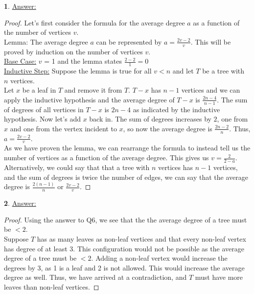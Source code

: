 \documentclass[12pt,a4paper]{article}
\theoremstyle{definition}
\newtheorem{problem}{}
\begin{document}
\begin{problem} \underline{Answer:}
\begin{proof} Let's first consider the formula for the average degree $a$ as a function of the number of vertices $v$. \\

Lemma: The average degree $a$ can be represented by $a = \frac{2v - 2}{v}$. This will be proved by induction on the number of vertices $v$. \\

\underline{Base Case:} $v$ = 1 and the lemma states $\frac{2 - 2}{1} = 0$ \\

\underline{Inductive Step:} Suppose the lemma is true for all $v < n$ and let $T$ be a tree with $n$ vertices. \\

Let $x$ be a leaf in $T$ and remove it from $T$. $T - x$ has $n - 1$ vertices and we can apply the inductive hypothesis and the average degree of $T - x$ is $\frac{2n - 4}{n - 1}$. The sum of degrees of all vertices in $T - x$ is $2n - 4$ as indicated by the inductive hypothesis. Now let's add $x$ back in. The sum of degrees increases by $2$, one from $x$ and one from the vertex incident to $x$, so now the average degree is $\frac{2n - 2}{n}$. Thus, $a = \frac{2v - 2}{v}$. \\

As we have proven the lemma, we can rearrange the formula to instead tell us the number of vertices as a function of the average degree. This gives us $v = \frac{2}{2 - a}$. Alternatively, we could say that that a tree with $n$ vertices has $n - 1$ vertices, and the sum of degrees is twice the number of edges, we can say that the average degree is $\frac{2(n - 1)}{n}$ or $\frac{2v - 2}{v}$.
\end{proof}
\end{problem}

\begin{problem} \underline{Answer:}
\begin{proof} 
Using the answer to Q6, we see that the the average degree of a tree must be $< 2$. \\

Suppose $T$ has as many leaves as non-leaf vertices and that every non-leaf vertex has degree of at least 3. This configuration would not be possible as the average degree of a tree must be $< 2$. Adding a non-leaf vertex would increase the degrees by 3, as 1 is a leaf and 2 is not allowed. This would increase the average degree as well. Thus, we have arrived at a contradiction, and $T$ must have more leaves than non-leaf vertices. 
\end{proof}
\end{problem}
\end{document}
